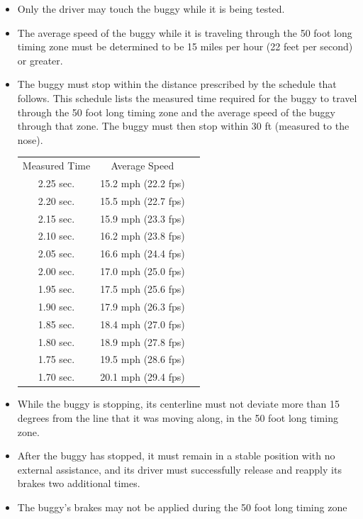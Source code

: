 	\begin{itemize}

		\item
		Only the driver may touch the buggy while it is being tested.

		\item
		The average speed of the buggy while it is traveling through the 50 foot long timing zone must be determined to be 15 miles per hour (22 feet per second) or greater.


		\item
		The buggy must stop within the distance prescribed by the schedule that follows. This schedule lists the measured time required for the buggy to travel through the 50 foot long timing zone and the average speed of the buggy through that zone. The buggy must then stop within 30 ft (measured to the nose).


			\begin{tabular}{c c c}
				Measured Time & Average Speed  \\
				2.25 sec. & 15.2 mph (22.2 fps)\\
				2.20 sec. & 15.5 mph (22.7 fps)\\
				2.15 sec. & 15.9 mph (23.3 fps)\\
				2.10 sec. & 16.2 mph (23.8 fps)\\
				2.05 sec. & 16.6 mph (24.4 fps)\\
				2.00 sec. & 17.0 mph (25.0 fps)\\
				1.95 sec. & 17.5 mph (25.6 fps)\\
				1.90 sec. & 17.9 mph (26.3 fps)\\
				1.85 sec. & 18.4 mph (27.0 fps)\\
				1.80 sec. & 18.9 mph (27.8 fps)\\
				1.75 sec. & 19.5 mph (28.6 fps)\\
				1.70 sec. & 20.1 mph (29.4 fps)\\
			\end{tabular}

		\item
		While the buggy is stopping, its centerline must not deviate more than 15 degrees from the line that it was moving along, in the 50 foot long timing zone.


		\item
		After the buggy has stopped, it must remain in a stable position with no external assistance, and its driver must successfully release and reapply its brakes two additional times.


		\item
		The buggy's brakes may not be applied during the 50 foot long timing zone

	\end{itemize}

